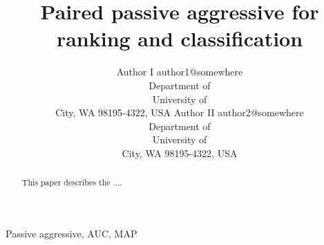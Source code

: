 \documentclass[twoside,11pt]{article}
\begin{document}
\title{Paired passive aggressive for ranking and classification}

\author{       \name Author I \email author1@somewhere \\
       \addr Department of \\
       University of \\
       City, WA 98195-4322, USA
       \AND
       \name Author II \email author2@somewhere \\
       \addr Department of \\
       University of \\
       City, WA 98195-4322, USA
       }

\maketitle

\begin{abstract}%
This paper describes the ....
\end{abstract}

\begin{keywords}
  Passive aggressive, AUC, MAP
\end{keywords}












\newpage

\appendix





\vskip 0.2in

\end{document}
